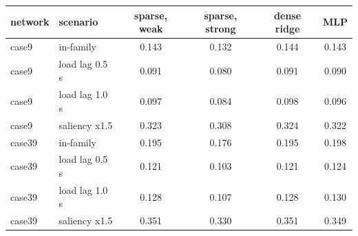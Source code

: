 \begin{tabular}{llcccc}
\toprule
network & scenario & sparse, weak & sparse, strong & dense ridge & MLP \\
\midrule
case9 & in-family & 0.143 & 0.132 & 0.144 & 0.143 \\
case9 & load lag 0.5 s & 0.091 & 0.080 & 0.091 & 0.090 \\
case9 & load lag 1.0 s & 0.097 & 0.084 & 0.098 & 0.096 \\
case9 & saliency x1.5 & 0.323 & 0.308 & 0.324 & 0.322 \\
\midrule
case39 & in-family & 0.195 & 0.176 & 0.195 & 0.198 \\
case39 & load lag 0.5 s & 0.121 & 0.103 & 0.121 & 0.124 \\
case39 & load lag 1.0 s & 0.128 & 0.107 & 0.128 & 0.130 \\
case39 & saliency x1.5 & 0.351 & 0.330 & 0.351 & 0.349 \\
\bottomrule
\end{tabular}
